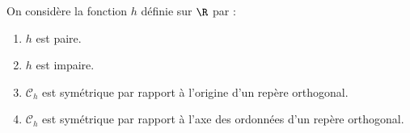 \begin{exo}{}
	On considère la fonction $h$ définie sur $\R$ par : 
	\begin{enumerate}
		\item $h$ est paire.
		\item $h$ est impaire.
		\item $\mathcal{C}_h$ est symétrique par rapport à l'origine d'un repère orthogonal.
		\item $\mathcal{C}_h$ est symétrique par rapport à l'axe des ordonnées d'un repère orthogonal.
	\end{enumerate}
\end{exo}
